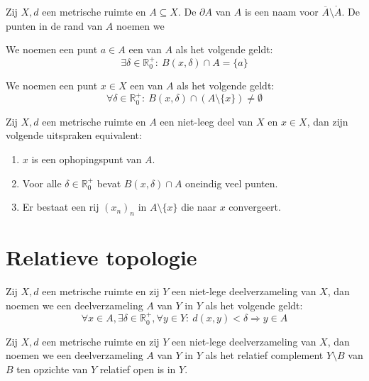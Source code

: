 \documentclass[main.tex]{subfiles}
\begin{document}
\begin{de}
  Zij $X,d$ een metrische ruimte en $A \subseteq X$.
  De  $\partial A$ van $A$ is een naam voor $\overline{A} \setminus \mathring{A}$.
  De punten in de rand van $A$ noemen we 
\end{de}

\begin{de}
  We noemen een punt $a\in A$ een  van $A$ als het volgende geldt:
  \[ \exists \delta \in \mathbb{R}_{0}^{+}:\ B(x,\delta) \cap A = \{a\} \]
\end{de}

\begin{de}
  We noemen een punt $x\in X$ een  van $A$ als het volgende geldt:
  \[ \forall \delta \in \mathbb{R}_{0}^{+}:\ B(x,\delta) \cap (A \setminus \{x\}) \neq \emptyset \]
\end{de}

\begin{pr}
  Zij $X,d$ een metrische ruimte en $A$ een niet-leeg deel van $X$ en $x\in X$, dan zijn volgende uitspraken equivalent:
  \begin{enumerate}
  \item $x$ is een ophopingspunt van $A$.
  \item Voor alle $\delta \in \mathbb{R}_{0}^{+}$ bevat $B(x,\delta) \cap A$ oneindig veel punten.
  \item Er bestaat een rij $(x_{n})_{n}$ in $A\setminus \{x\}$ die naar $x$ convergeert.
  \end{enumerate}
\end{pr}


\section{Relatieve topologie}
\label{sec:relatieve-topologie}

\begin{de}
  Zij $X,d$ een metrische ruimte en zij $Y$ een niet-lege deelverzameling van $X$, dan noemen we een deelverzameling $A$ van $Y$  in $Y$ als het volgende geldt:
  \[ \forall x\in A, \exists \delta \in \mathbb{R}_{0}^{+}, \forall y\in Y:\ d(x,y) < \delta \Rightarrow y\in A \]
\end{de}

\begin{de}
  Zij $X,d$ een metrische ruimte en zij $Y$ een niet-lege deelverzameling van $X$, dan noemen we een deelverzameling $A$ van $Y$  in $Y$ als het relatief complement $Y\setminus B$ van $B$ ten opzichte van $Y$ relatief open is in $Y$.
\end{de}
\end{document}
